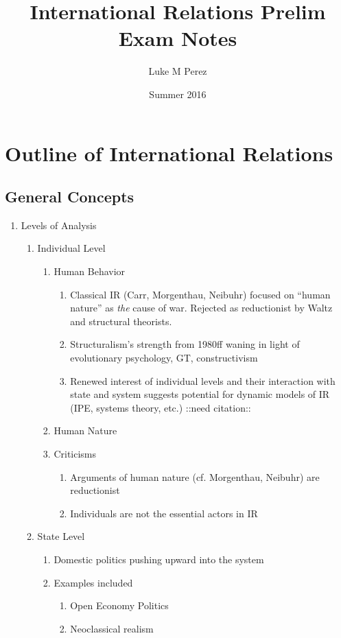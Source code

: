 \documentclass[11pt]{article}
\author{Luke M Perez}
\date{Summer 2016}
\title{International Relations Prelim Exam Notes}
\begin{document}
\maketitle



\section{Outline of International Relations}
\label{sec-1}
\subsection{General Concepts}
\label{sec-1-1}
\begin{enumerate}
\item Levels of Analysis
\label{sec-1-1-1}
\begin{enumerate}
\item Individual Level
\begin{enumerate}
\item Human Behavior
\begin{enumerate}
\item Classical IR (Carr, Morgenthau, Neibuhr) focused on ``human
nature'' as \emph{the} cause of war. Rejected as reductionist by
Waltz and structural theorists.
\item Structuralism's strength from 1980ff waning in light of
evolutionary psychology, GT, constructivism
\item Renewed interest of individual levels and their interaction
with state and system suggests potential for dynamic models
of IR (IPE, systems theory, etc.) ::need citation::
\end{enumerate}
\item Human Nature
\item Criticisms
\begin{enumerate}
\item Arguments of human nature (cf. Morgenthau, Neibuhr) are
reductionist
\item Individuals are not the essential actors in IR
\end{enumerate}
\end{enumerate}
\item State Level
\begin{enumerate}
\item Domestic politics pushing upward into the system
\item Examples included
\begin{enumerate}
\item Open Economy Politics
\item Neoclassical realism
\end{enumerate}
\end{enumerate}


\end{enumerate}
\end{enumerate}
\end{document}
